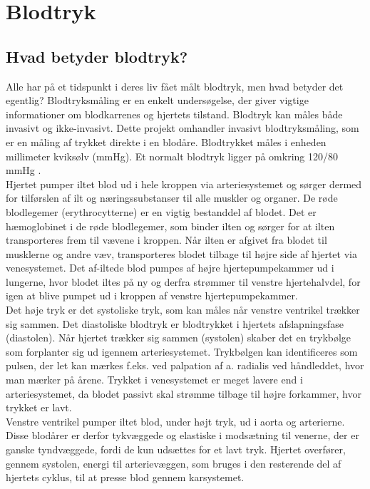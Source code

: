 \chapter{Blodtryk}
\section{Hvad betyder blodtryk?} 
Alle har på et tidspunkt i deres liv fået målt blodtryk, men hvad betyder det egentlig?
Blodtryksmåling er en enkelt undersøgelse, der giver vigtige informationer om blodkarrenes og hjertets tilstand. Blodtryk kan måles både invasivt og ikke-invasivt. Dette projekt omhandler invasivt blodtryksmåling, som er en måling af trykket direkte i en blodåre. 
Blodtrykket måles i enheden millimeter kviksølv (mmHg). Et normalt blodtryk ligger på omkring 120/80 mmHg \cite{Blodtryk}. \\ 
Hjertet pumper iltet blod ud i hele kroppen via arteriesystemet og sørger dermed for tilførslen af ilt og næringssubstanser til alle muskler og organer. De røde blodlegemer (erythrocytterne) er en vigtig bestanddel af blodet. Det er hæmoglobinet i de røde blodlegemer, som binder ilten og sørger for at ilten transporteres frem til vævene i kroppen. Når ilten er afgivet fra blodet til musklerne og andre væv, transporteres blodet tilbage til højre side af hjertet via venesystemet. Det af-iltede blod pumpes af højre hjertepumpekammer ud i lungerne, hvor blodet iltes på ny og derfra strømmer til venstre hjertehalvdel, for igen at blive pumpet ud i kroppen af venstre hjertepumpekammer. \\
Det høje tryk er det systoliske tryk, som kan måles når venstre ventrikel trækker sig sammen. Det diastoliske blodtryk er blodtrykket i hjertets afslapningsfase (diastolen). Når hjertet trækker sig sammen (systolen) skaber det en trykbølge som forplanter sig ud igennem arteriesystemet. Trykbølgen kan identificeres som pulsen, der let kan mærkes f.eks. ved palpation af a. radialis ved håndleddet, hvor man mærker på årene. Trykket i venesystemet er meget lavere end i arteriesystemet, da blodet passivt skal strømme tilbage til højre forkammer, hvor trykket er lavt. \\
Venstre ventrikel pumper iltet blod, under højt tryk, ud i aorta og arterierne. Disse blodårer er derfor tykvæggede og elastiske i modsætning til venerne, der er ganske tyndvæggede, fordi de kun udsættes for et lavt tryk. Hjertet overfører, gennem systolen, energi til arterievæggen, som bruges i den resterende del af hjertets cyklus, til at presse blod gennem karsystemet. 


